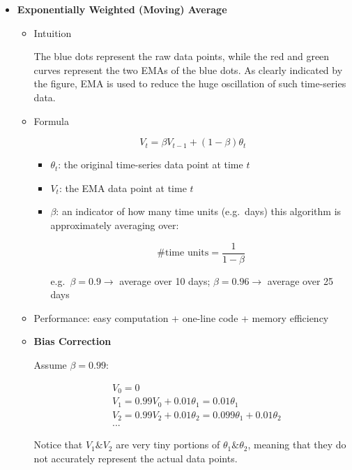 \documentclass[
]{book}
\begin{document}
\begin{itemize}
\item
  \textbf{Exponentially Weighted (Moving) Average}

  \begin{itemize}
  \item
    Intuition

    The blue dots represent the raw data points, while the red and green
    curves represent the two EMAs of the blue dots. As clearly indicated
    by the figure, EMA is used to reduce the huge oscillation of such
    time-series data.
  \item
    Formula

    \[\begin{equation}
      V_t=\beta V_{t-1}+(1-\beta)\theta_t
      \end{equation}\]

    \begin{itemize}
    \item
      \(\theta_t\): the original time-series data point at time \(t\)
    \item
      \(V_t\): the EMA data point at time \(t\)
    \item
      \(\beta\): an indicator of how many time units (e.g.~days) this
      algorithm is approximately averaging over:

      \[\begin{equation}
        \text{#time units}=\frac{1}{1-\beta}
        \end{equation}\]

      e.g.~\(\beta=0.9 \rightarrow\) average over 10 days;
      \(\beta=0.96 \rightarrow\) average over 25 days
    \end{itemize}
  \item
    Performance: easy computation + one-line code + memory efficiency
  \item
    \textbf{Bias Correction}

    Assume \(\beta=0.99\):

    \[\begin{align}
      &V_0=0 \\
      &V_1=0.99 V_0+0.01\theta_1=0.01\theta_1 \\
      &V_2=0.99 V_2+0.01\theta_2=0.099\theta_1+0.01\theta_2 \\
      &...
      \end{align}\]

    Notice that \(V_1 \& V_2\) are very tiny portions of
    \(\theta_1 \& \theta_2\), meaning that they do not accurately
    represent the actual data points.


\end{itemize}
\end{itemize}
\end{document}
